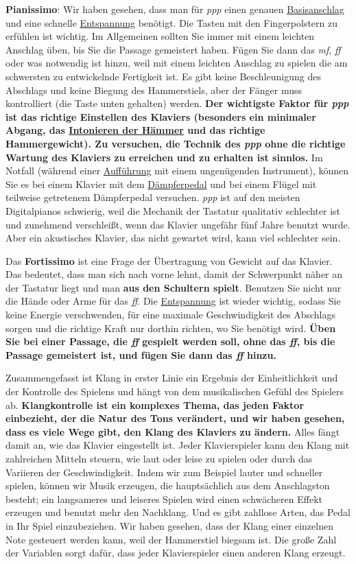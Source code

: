 \textbf{Pianissimo}:
Wir haben gesehen, dass man für \textit{ppp} einen genauen \hyperref[c1iii1a1]{Basisanschlag} und eine schnelle \hyperref[c1ii14]{Entspannung} benötigt.
Die Tasten mit den Fingerpolstern zu erfühlen ist wichtig.
Im Allgemeinen sollten Sie immer mit einem leichten Anschlag üben, bis Sie die Passage gemeistert haben.
Fügen Sie dann das \textit{mf}, \textit{ff} oder was notwendig ist hinzu, weil mit einem leichten Anschlag zu spielen die am schwersten zu entwickelnde Fertigkeit ist.
Es gibt keine Beschleunigung des Abschlags und keine Biegung des Hammerstiels, aber der Fänger muss kontrolliert (die Taste unten gehalten) werden.
\textbf{Der wichtigste Faktor für \textit{ppp} ist das richtige Einstellen des Klaviers (besonders ein minimaler Abgang, das \hyperref[c2_7_hamm]{Intonieren der Hämmer} und das richtige Hammergewicht).
Zu versuchen, die Technik des \textit{ppp} ohne die richtige Wartung des Klaviers zu erreichen und zu erhalten ist sinnlos.}
Im Notfall (während einer \hyperref[c1iii14]{Aufführung} mit einem ungenügenden Instrument), können Sie es bei einem Klavier mit dem \hyperref[c1ii24]{Dämpferpedal} und bei einem Flügel mit teilweise getretenem Dämpferpedal versuchen.
\textit{ppp} ist auf den meisten Digitalpianos schwierig, weil die Mechanik der Tastatur qualitativ schlechter ist und zunehmend verschleißt, wenn das Klavier ungefähr fünf Jahre benutzt wurde.
Aber ein akustisches Klavier, das nicht gewartet wird, kann viel schlechter sein.

Das \textbf{Fortissimo} ist eine Frage der Übertragung von Gewicht auf das Klavier.
Das bedeutet, dass man sich nach vorne lehnt, damit der Schwerpunkt näher an der Tastatur liegt und man \textbf{aus den Schultern spielt}.
Benutzen Sie nicht nur die Hände oder Arme für das \textit{ff}.
Die \hyperref[c1ii14]{Entspannung} ist wieder wichtig, sodass Sie keine Energie verschwenden, für eine maximale Geschwindigkeit des Abschlags sorgen und die richtige Kraft nur dorthin richten, wo Sie benötigt wird.
\textbf{Üben Sie bei einer Passage, die \textit{ff} gespielt werden soll, ohne das \textit{ff}, bis die Passage gemeistert ist, und fügen Sie dann das \textit{ff} hinzu.}

Zusammengefasst ist Klang in erster Linie ein Ergebnis der Einheitlichkeit und der Kontrolle des Spielens und hängt von dem musikalischen Gefühl des Spielers ab.
\textbf{Klangkontrolle ist ein komplexes Thema, das jeden Faktor einbezieht, der die Natur des Tons verändert, und wir haben gesehen, dass es viele Wege gibt, den Klang des Klaviers zu ändern.}
Alles fängt damit an, wie das Klavier eingestellt ist.
Jeder Klavierspieler kann den Klang mit zahlreichen Mitteln steuern, wie laut oder leise zu spielen oder durch das Variieren der Geschwindigkeit.
Indem wir zum Beispiel lauter und schneller spielen, können wir Musik erzeugen, die hauptsächlich aus dem Anschlagston besteht;
ein langsameres und leiseres Spielen wird einen schwächeren Effekt erzeugen und benutzt mehr den Nachklang.
Und es gibt zahllose Arten, das Pedal in Ihr Spiel einzubeziehen.
Wir haben gesehen, dass der Klang einer einzelnen Note gesteuert werden kann, weil der Hammerstiel biegsam ist.
Die große Zahl der Variablen sorgt dafür, dass jeder Klavierspieler einen anderen Klang erzeugt.
 

